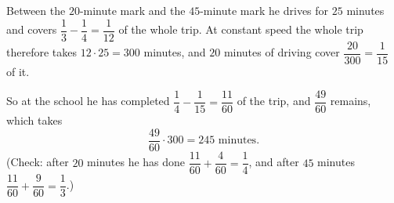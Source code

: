 Between the $20$-minute mark and the $45$-minute mark he drives for $25$ minutes and covers $\dfrac13-\dfrac14=\dfrac1{12}$ of the whole trip. At constant speed the whole trip therefore takes $12\cdot25=300$ minutes, and $20$ minutes of driving cover $\dfrac{20}{300}=\dfrac1{15}$ of it.

So at the school he has completed $\dfrac14-\dfrac1{15}=\dfrac{11}{60}$ of the trip, and $\dfrac{49}{60}$ remains, which takes
\[\dfrac{49}{60}\cdot300=\boxed{245}\text{ minutes}.\]
(Check: after $20$ minutes he has done $\dfrac{11}{60}+\dfrac{4}{60}=\dfrac14$, and after $45$ minutes $\dfrac{11}{60}+\dfrac{9}{60}=\dfrac13$.)
